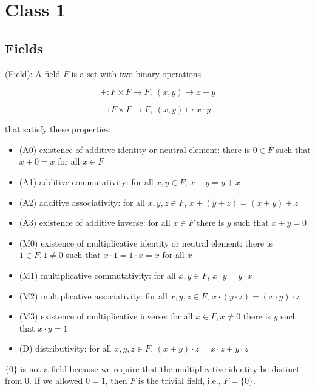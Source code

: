 \section{Class 1}

\subsection{Fields}

\begin{definition}
(Field): A field $F$ is a set with two binary operations

\[
+: F \times F \to F,\ (x, y) \mapsto x + y
\]

\[
\cdot: F \times F \to F,\ (x, y) \mapsto x \cdot y
\]

that satisfy these properties:
\begin{itemize}
\item (A0) existence of additive identity or neutral element: there is $0 \in F$ such that $x + 0 = x$ for all $x \in F$
\item (A1) additive commutativity: for all $x, y \in F$, $x + y = y + x$
\item (A2) additive associativity: for all $x, y, z \in F$, $x + (y + z) = (x + y) + z$
\item (A3) existence of additive inverse: for all $x \in F$ there is $y$ such that $x + y = 0$
\item (M0) existence of multiplicative identity or neutral element: there is $1 \in F, 1 \neq 0$ such that $x \cdot 1 = 1 \cdot x = x$ for all $x$
\item (M1) multiplicative commutativity: for all $x, y \in F$, $x \cdot y = y \cdot x$
\item (M2) multiplicative associativity: for all $x, y, z \in F$, $x \cdot (y \cdot z) = (x \cdot y) \cdot z$
\item (M3) existence of multiplicative inverse: for all $x \in F, x \neq 0$ there is $y$ such that $x \cdot y = 1$
\item (D) distributivity: for all $x, y, z \in F$, $(x + y) \cdot z = x \cdot z + y \cdot z$
\end{itemize}
\end{definition}

\begin{remark}
$\{ 0 \}$ is not a field because we require that the multiplicative identity be distinct from 0. If we allowed $0 = 1$, then $F$ is the trivial field, i.e., $F = \{ 0 \}$. \\
\end{remark}

